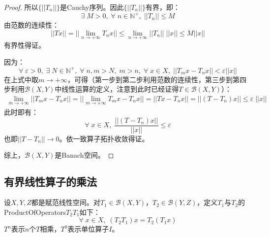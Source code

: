 \begin{proof}
	所以$\{||T_n||\}$是Cauchy序列。因此$\{||T_n||\}$有界，即：
	\begin{equation*}
		\exists\;M>0,\;\forall\;n\in\mathbb{N}^+,\;||T_n||\leqslant M
	\end{equation*}
	由范数的连续性：
	\begin{equation*}
		||Tx||=||\lim_{n\to+\infty}T_nx||\leqslant\lim_{n\to+\infty}||T_n||\;||x||\leqslant M||x||
	\end{equation*}
	有界性得证。\par
	因为：
	\begin{equation*}
		\forall\;\varepsilon>0,\;\exists\;N\in\mathbb{N}^+,\;\forall\;n,m>N,\;m>n,\;\forall\;x\in X,\;||T_mx-T_nx||<\varepsilon||x||
	\end{equation*}	
	在上式中取$m\to+\infty$，可得（第一步到第二步利用范数的连续性，第三步到第四步利用$\mathscr{B}(X,Y)$中线性运算的定义，注意到此时已经证得$T\in\mathscr{B}(X,Y)$）：
	\begin{align*}
		\lim_{m\to+\infty}||T_mx-T_nx||=||\lim_{m\to+\infty}T_mx-T_nx||=||Tx-T_nx||=||(T-T_n)x||\leqslant\varepsilon\;||x||
	\end{align*}
	此时即有：
	\begin{equation*}
		\forall\;x\in X,\;\frac{||(T-T_n)x||}{||x||}\leqslant\varepsilon
	\end{equation*}
	也即$||T-T_n||\to0$。依一致算子拓扑收敛得证。\par
	综上，$\mathscr{B}(X,Y)$是Banach空间。
\end{proof}

\subsection{有界线性算子的乘法}
\begin{definition}
	设$X,Y,Z$都是赋范线性空间。对$T_1\in\mathscr{B}(X,Y)$，$T_2\in\mathscr{B}(Y,Z)$，定义$T_1$与$T_2$的\gls{ProductOfOperators}$T_2T_1$如下：
	\begin{equation*}
		\forall\;x\in X,\;(T_2T_1)x=T_2(T_1x)
	\end{equation*}	
	$T^n$表示$n$个$T$相乘，$T^0$表示单位算子$I$。
\end{definition}
